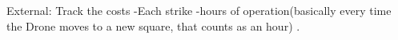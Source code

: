 \documentclass[12pt,letter,draft]{article}
\begin{document}
\begin{spacing}{1.5}
External:
Track the costs
-Each strike
-hours of operation(basically every time the Drone moves to a new square, that counts as an hour) . 









\end{spacing}

\pagebreak



\nocite{*}
\end{document}
